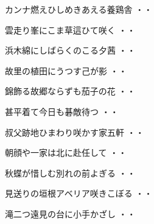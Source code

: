 \vspace{0.6cm}
\begin{shiika}カンナ燃えひしめきあえる養鶏舎
\hfill{・・}\end{shiika}
\vspace{0.6cm}
\begin{shiika}雲走り峯にこま草這ひて咲く
\hfill{・・}\end{shiika}
\vspace{0.6cm}
\begin{shiika}浜木綿にしばらくのこる夕茜
\hfill{・・}\end{shiika}
\vspace{0.6cm}
\begin{shiika}故里の植田にうつす己が影
\hfill{・・}\end{shiika}
\vspace{0.6cm}
\begin{shiika}錦飾る故郷ならずも茄子の花
\hfill{・・}\end{shiika}
\vspace{0.6cm}
\begin{shiika}甚平着て今日も碁敵待つ
\hfill{・・}\end{shiika}
\vspace{0.6cm}
\begin{shiika}叔父跡地ひまわり咲かす家五軒
\hfill{・・}\end{shiika}
\vspace{0.6cm}
\begin{shiika}朝顔や一家は北に赴任して
\hfill{・・}\end{shiika}
\vspace{0.6cm}
\begin{shiika}秋蝶が惜しむ別れの前よぎる
\hfill{・・}\end{shiika}
\vspace{0.6cm}
\begin{shiika}見送りの垣根アベリア咲きこぼる
\hfill{・・}\end{shiika}
\vspace{0.6cm}
\begin{shiika}滝二つ遠見の台に小手かざし
\hfill{・・}\end{shiika}
